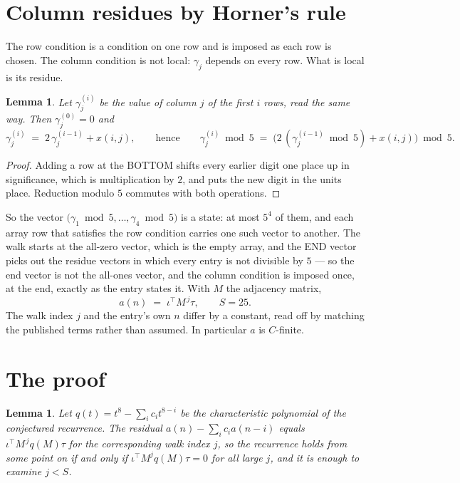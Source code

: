 \documentclass[11pt,a4paper]{article}
\theoremstyle{plain}
\newtheorem{lemma}[theorem]{Lemma}
\theoremstyle{definition}
\begin{document}
\section{Column residues by Horner's rule}

The row condition is a condition on one row and is imposed as each row is chosen. The column
condition is not local: $\gamma_j$ depends on every row. What is local is its residue.

\begin{lemma}\label{lem:horner}
Let $\gamma_j^{(i)}$ be the value of column $j$ of the first $i$ rows, read the same way.
Then $\gamma_j^{(0)}=0$ and
\[
\gamma_j^{(i)}\;=\;2\,\gamma_j^{(i-1)}+x(i,j),
\qquad\text{hence}\qquad
\gamma_j^{(i)}\bmod 5\;=\;
\bigl(2\,(\gamma_j^{(i-1)}\bmod 5)+x(i,j)\bigr)\bmod 5 .
\]
\end{lemma}

\begin{proof}
Adding a row at the BOTTOM shifts every earlier digit one place up in significance, which is
multiplication by $2$, and puts the new digit in the units place. Reduction modulo
$5$ commutes with both operations.
\end{proof}

So the vector $\bigl(\gamma_1\bmod 5,\dots,\gamma_{4}\bmod
5\bigr)$ is a state: at most $5^{4}$ of them, and each array row
that satisfies the row condition carries one such vector to another. The walk starts at the
all-zero vector, which is the empty array, and the END vector picks out the residue vectors in
which every entry is not divisible by $5$ --- so the end vector is not the all-ones
vector, and the column condition is imposed once, at the end, exactly as the entry states it.
With $M$ the adjacency matrix,
\[
a(n)\;=\;\iota^{\!\top}M^{\,j}\tau ,\qquad S=25.
\]
The walk index $j$ and the entry's own $n$ differ by a constant, read off by matching the
published terms rather than assumed. In particular $a$ is $C$-finite.

\section{The proof}

\begin{lemma}\label{lem:crit}
Let $q(t)=t^{8}-\sum_i c_it^{8-i}$ be the characteristic polynomial of the
conjectured recurrence. The residual $a(n)-\sum_ic_ia(n-i)$ equals
$\iota^{\!\top}M^{\,j}q(M)\tau$ for the corresponding walk index $j$, so the recurrence
holds from some point on if and only if $\iota^{\!\top}M^{j}q(M)\tau=0$ for all large $j$,
and it is enough to examine $j<S$.
\end{lemma}
\end{document}
